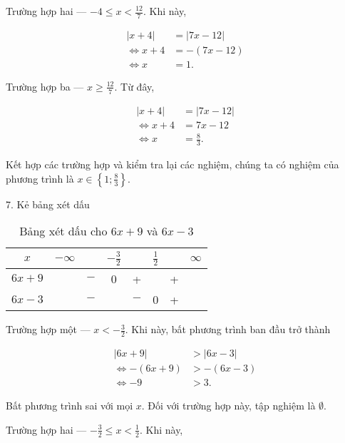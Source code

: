 \textcolor{colorEmphasis}{Trường hợp hai --- $-4\leq x < \frac{12}{7} $}. Khi này, 

\begin{align*}
   |x + 4| &= |7x - 12| \\
   \iff x + 4 &= -(7x - 12) \\
   \iff x &= 1.
\end{align*}

\textcolor{colorEmphasisGreen}{Trường hợp ba --- $x \geq \frac{12}{7}$}. Từ đây,

\begin{align*}
   |x + 4| &= |7x - 12| \\
   \iff x + 4 &= 7x - 12 \\
   \iff x &= \frac{8}{3}.
\end{align*}

Kết hợp các trường hợp và kiểm tra lại các nghiệm, chúng ta có nghiệm của phương trình là $x \in \left\{1; \frac{8}{3}\right\}$.

7. Kẻ bảng xét dấu

\begin{table}[H]
   \centering
   \begin{tabular}{|c|ccccccc|}
   \hline
   $x$          & $-\infty$ &     & $-\frac{3}{2}$ &     & $\frac{1}{2}$ &   & $\infty$ \\
   \hline
   $6x + 9$        &           & $-$ &  0  &  +  &     & + &           \\
   \hline
   $6x - 3$        &           & $-$ &     & $-$ &  0  & + &           \\
   \hline
   \end{tabular}
   \caption{Bảng xét dấu cho $6x + 9$ và $6x - 3$}
   \label{tab:toan_hoc_nen_tang:ham_so_mot_bien:ham_tung_phan:gpt7}
\end{table}

\textcolor{colorEmphasisCyan}{Trường hợp một --- $x < -\frac{3}{2}$}. Khi này, bất phương trình ban đầu trở thành

\begin{align*}
   |6x + 9| &> |6x - 3| \\
   \iff -(6x + 9) &> -(6x - 3) \\
   \iff -9 &> 3.
\end{align*}

Bất phương trình sai với mọi $x$. Đối với trường hợp này, tập nghiệm là $\emptyset$.

\textcolor{colorEmphasis}{Trường hợp hai --- $-\frac{3}{2} \leq x < \frac{1}{2}$}. Khi này,


